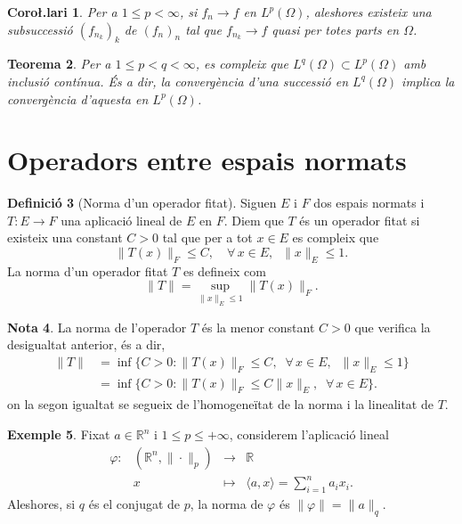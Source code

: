\documentclass[12pt]{book}
\newtheorem{teorema}{Teorema}[chapter]
\newtheorem{coro}[teorema]{Coro\l.lari}
\theoremstyle{definition}
\newtheorem{defi}[teorema]{Definició}
\theoremstyle{nota}
\newtheorem{nota}[teorema]{Nota}
\theoremstyle{exemple}
\newtheorem{exemple}[teorema]{Exemple}
\begin{document}
\begin{coro}
  Per a $1 \leq p < \infty$, si $f_n \to f$ en $L^p(\Omega)$,
  aleshores existeix una subsuccessió $(f_{n_k})_k$ de $(f_n)_n$ tal
  que $f_{n_k} \to f$ quasi per totes parts en $\Omega$.
\end{coro}

\begin{teorema}
  Per a $1 \leq p < q < \infty$, es compleix que
  $L^q(\Omega) \subset L^p(\Omega)$ amb inclusió contínua. És a dir,
  la convergència d'una successió en $L^q(\Omega)$ implica la
  convergència d'aquesta en $L^p(\Omega)$.
\end{teorema}

\section{Operadors entre espais normats}

\begin{defi}[Norma d'un operador fitat]
  Siguen $E$ i $F$ dos espais normats i $T : E \to F$ una aplicació
  lineal de $E$ en $F$. Diem que $T$ és un operador fitat si existeix
  una constant $C > 0$ tal que per a tot $x \in E$ es compleix que
  \[
    \|T(x)\|_F \leq C, \quad \forall\, x \in E, \;\; \|x\|_E \leq 1.
  \]
  La norma d'un operador fitat $T$ es defineix com
  \[
    \|T\| = \sup_{\|x\|_E \leq 1} \|T(x)\|_F.
  \]
\end{defi}

\begin{nota}
  La norma de l'operador $T$ és la menor constant $C > 0$ que verifica
  la desigualtat anterior, és a dir,
  \begin{align*}
    \|T\| &= \inf\{C > 0 : \|T(x)\|_F \leq C,
            \;\; \forall\, x \in E, \;\; \|x\|_E \leq 1\} \\
          &= \inf\{C > 0 : \|T(x)\|_F \leq C \|x\|_E,
            \;\; \forall\, x \in E\}.
  \end{align*}
  on la segon igualtat se segueix de l'homogeneïtat de la norma i la
  linealitat de $T$.
\end{nota}

\begin{exemple}
  Fixat $a \in \mathbb{R}^n$ i $1 \leq p \leq +\infty$, considerem
  l'aplicació lineal
  \begin{equation*}
    \begin{array}{lrcl}
      \varphi :
      & (\mathbb{R}^n, \|\cdot\|_p) &\longrightarrow& \mathbb{R} \\
      & x &\longmapsto& \langle a, x \rangle = \sum\limits_{i=1}^{n}a_ix_i.
    \end{array}
  \end{equation*}
  Aleshores, si $q$ és el conjugat de $p$, la norma de $\varphi$ és
  $\|\varphi\| = \|a\|_q$.
\end{exemple}
\end{document}
